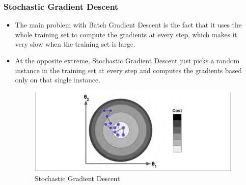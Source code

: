 \documentclass[11pt]{beamer}
\begin{document}
\begin{frame}
	\frametitle{Stochastic Gradient Descent}
	\begin{itemize}
		\item The main problem with Batch Gradient Descent is the fact that it uses the whole training set to compute the gradients at every step, which makes it very slow when the training set is large. 
		\pause
		\item At the opposite extreme, Stochastic Gradient Descent just picks a random instance in the training set at every step and computes the gradients based only on that single instance.
		\begin{figure}
			\centering
			\includegraphics[scale=0.29]{figure4-9}
			\caption{Stochastic Gradient Descent}
		\end{figure}		
	\end{itemize}
\end{frame}
\end{document}

